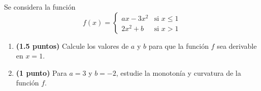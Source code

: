 
Se considera la función
\[
f(x)=\begin{cases}
ax-3x^2 & \text{si }x\leq 1\\[4pt]
2x^2+b & \text{si }x>1
\end{cases}
\]
\begin{enumerate}[label=\alph*)]
\item \textbf{(1.5 puntos)} Calcule los valores de $a$ y $b$ para que la función $f$ sea derivable en $x=1$.
\item \textbf{(1 punto)} Para $a=3$ y $b=-2$, estudie la monotonía y curvatura de la función $f$.
\end{enumerate}
